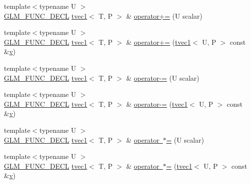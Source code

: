 \begin{DoxyCompactItemize}
\item 
{\footnotesize template$<$typename U $>$ }\\\mbox{\hyperlink{setup_8hpp_ab2d052de21a70539923e9bcbf6e83a51}{G\+L\+M\+\_\+\+F\+U\+N\+C\+\_\+\+D\+E\+CL}} \mbox{\hyperlink{structglm_1_1tvec1}{tvec1}}$<$ T, P $>$ \& \mbox{\hyperlink{structglm_1_1tvec1_a12dd2a58cc8e8c2abba3aea0e54c7236}{operator+=}} (U scalar)
\item 
{\footnotesize template$<$typename U $>$ }\\\mbox{\hyperlink{setup_8hpp_ab2d052de21a70539923e9bcbf6e83a51}{G\+L\+M\+\_\+\+F\+U\+N\+C\+\_\+\+D\+E\+CL}} \mbox{\hyperlink{structglm_1_1tvec1}{tvec1}}$<$ T, P $>$ \& \mbox{\hyperlink{structglm_1_1tvec1_af0d6bb22d35f767a748be6fa086c4911}{operator+=}} (\mbox{\hyperlink{structglm_1_1tvec1}{tvec1}}$<$ U, P $>$ const \&\mbox{\hyperlink{glad_8h_a14cfbe2fc2234f5504618905b69d1e06}{v}})
\item 
{\footnotesize template$<$typename U $>$ }\\\mbox{\hyperlink{setup_8hpp_ab2d052de21a70539923e9bcbf6e83a51}{G\+L\+M\+\_\+\+F\+U\+N\+C\+\_\+\+D\+E\+CL}} \mbox{\hyperlink{structglm_1_1tvec1}{tvec1}}$<$ T, P $>$ \& \mbox{\hyperlink{structglm_1_1tvec1_a2ade1f5cb35f7160222213a3c4052fec}{operator-\/=}} (U scalar)
\item 
{\footnotesize template$<$typename U $>$ }\\\mbox{\hyperlink{setup_8hpp_ab2d052de21a70539923e9bcbf6e83a51}{G\+L\+M\+\_\+\+F\+U\+N\+C\+\_\+\+D\+E\+CL}} \mbox{\hyperlink{structglm_1_1tvec1}{tvec1}}$<$ T, P $>$ \& \mbox{\hyperlink{structglm_1_1tvec1_ad2c5971147b89ac3a660d88296ec2a74}{operator-\/=}} (\mbox{\hyperlink{structglm_1_1tvec1}{tvec1}}$<$ U, P $>$ const \&\mbox{\hyperlink{glad_8h_a14cfbe2fc2234f5504618905b69d1e06}{v}})
\item 
{\footnotesize template$<$typename U $>$ }\\\mbox{\hyperlink{setup_8hpp_ab2d052de21a70539923e9bcbf6e83a51}{G\+L\+M\+\_\+\+F\+U\+N\+C\+\_\+\+D\+E\+CL}} \mbox{\hyperlink{structglm_1_1tvec1}{tvec1}}$<$ T, P $>$ \& \mbox{\hyperlink{structglm_1_1tvec1_a50b20bd3b7beb5c23b53d49ba07e1ee5}{operator $\ast$=}} (U scalar)
\item 
{\footnotesize template$<$typename U $>$ }\\\mbox{\hyperlink{setup_8hpp_ab2d052de21a70539923e9bcbf6e83a51}{G\+L\+M\+\_\+\+F\+U\+N\+C\+\_\+\+D\+E\+CL}} \mbox{\hyperlink{structglm_1_1tvec1}{tvec1}}$<$ T, P $>$ \& \mbox{\hyperlink{structglm_1_1tvec1_aead4fc78cff7b51e4d213e71fd5ce6a3}{operator $\ast$=}} (\mbox{\hyperlink{structglm_1_1tvec1}{tvec1}}$<$ U, P $>$ const \&\mbox{\hyperlink{glad_8h_a14cfbe2fc2234f5504618905b69d1e06}{v}})

\end{DoxyCompactItemize}
